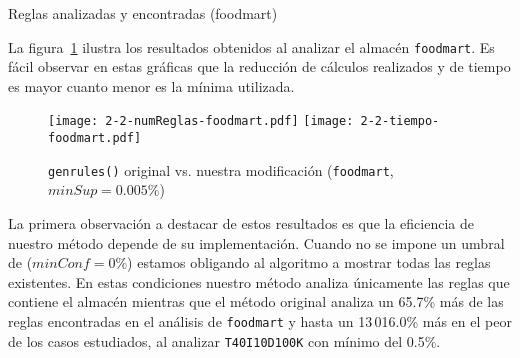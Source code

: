 \begin{table}[htb]
   \caption{Reglas analizadas y encontradas (foodmart)}
   \label{tab:foodmart}
\end{table}

La figura~\ref{fig:2-3-1-genrulesFoodmart} ilustra los resultados obtenidos al analizar el almacén \texttt{foodmart}. Es fácil observar en estas gráficas que la reducción de cálculos realizados y de tiempo es mayor cuanto menor es la \confianza mínima utilizada.

\begin{figure}[hbt]
  \centering
  \texttt{[image: 2-2-numReglas-foodmart.pdf]}
  \hspace{.1\textwidth}
  \texttt{[image: 2-2-tiempo-foodmart.pdf]}
	\caption[\texttt{genrules()} original vs. nuestra modificación]{\footnotesize \texttt{genrules()} original vs. nuestra modificación (\texttt{foodmart}, $minSup=0.005\%$)}
	\label{fig:2-3-1-genrulesFoodmart}
\end{figure}


La primera observación a destacar de estos resultados es que la eficiencia de nuestro método depende de su implementación. Cuando no se impone un umbral de \confianza ($minConf = 0\%$) estamos obligando al algoritmo a mostrar todas las reglas existentes. En estas condiciones nuestro método analiza únicamente las reglas que contiene el almacén \D mientras que el método original analiza un 65.7\% más de las reglas encontradas en el análisis de \texttt{foodmart} y hasta un 13\,016.0\% más en el peor de los casos estudiados, al analizar \texttt{T40I10D100K} con \soporte mínimo del 0.5\%.




